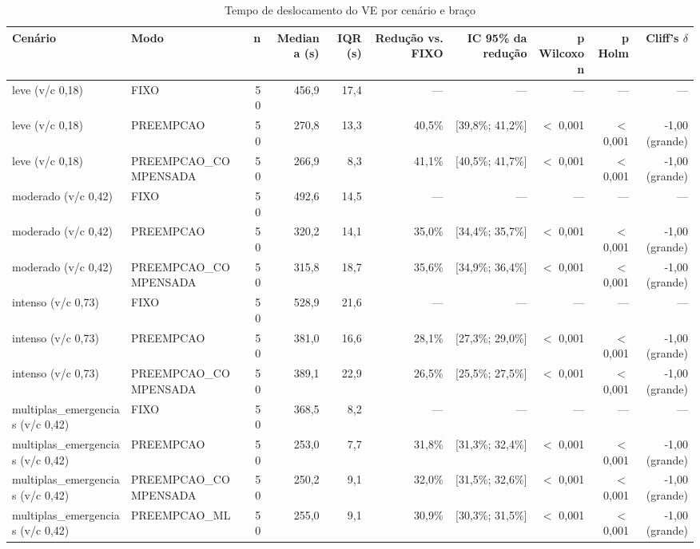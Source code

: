 \begin{table}[htbp]
\centering
\caption{Tempo de deslocamento do VE por cenário e braço}
\label{tab:t1}
\small
\begin{tabular}{llrrrrrrrr}
\toprule
Cenário & Modo & n & Mediana (s) & IQR (s) & Redução vs. FIXO & IC 95\% da redução & p Wilcoxon & p Holm & Cliff's $\delta$ \\
\midrule
leve (v/c 0,18) & FIXO & 50 & 456,9 & 17,4 & — & — & — & — & — \\
leve (v/c 0,18) & PREEMPCAO & 50 & 270,8 & 13,3 & 40,5\% & [39,8\%; 41,2\%] & $<$ 0,001 & $<$ 0,001 & -1,00 (grande) \\
leve (v/c 0,18) & PREEMPCAO\_COMPENSADA & 50 & 266,9 & 8,3 & 41,1\% & [40,5\%; 41,7\%] & $<$ 0,001 & $<$ 0,001 & -1,00 (grande) \\
moderado (v/c 0,42) & FIXO & 50 & 492,6 & 14,5 & — & — & — & — & — \\
moderado (v/c 0,42) & PREEMPCAO & 50 & 320,2 & 14,1 & 35,0\% & [34,4\%; 35,7\%] & $<$ 0,001 & $<$ 0,001 & -1,00 (grande) \\
moderado (v/c 0,42) & PREEMPCAO\_COMPENSADA & 50 & 315,8 & 18,7 & 35,6\% & [34,9\%; 36,4\%] & $<$ 0,001 & $<$ 0,001 & -1,00 (grande) \\
intenso (v/c 0,73) & FIXO & 50 & 528,9 & 21,6 & — & — & — & — & — \\
intenso (v/c 0,73) & PREEMPCAO & 50 & 381,0 & 16,6 & 28,1\% & [27,3\%; 29,0\%] & $<$ 0,001 & $<$ 0,001 & -1,00 (grande) \\
intenso (v/c 0,73) & PREEMPCAO\_COMPENSADA & 50 & 389,1 & 22,9 & 26,5\% & [25,5\%; 27,5\%] & $<$ 0,001 & $<$ 0,001 & -1,00 (grande) \\
multiplas\_emergencias (v/c 0,42) & FIXO & 50 & 368,5 & 8,2 & — & — & — & — & — \\
multiplas\_emergencias (v/c 0,42) & PREEMPCAO & 50 & 253,0 & 7,7 & 31,8\% & [31,3\%; 32,4\%] & $<$ 0,001 & $<$ 0,001 & -1,00 (grande) \\
multiplas\_emergencias (v/c 0,42) & PREEMPCAO\_COMPENSADA & 50 & 250,2 & 9,1 & 32,0\% & [31,5\%; 32,6\%] & $<$ 0,001 & $<$ 0,001 & -1,00 (grande) \\
multiplas\_emergencias (v/c 0,42) & PREEMPCAO\_ML & 50 & 255,0 & 9,1 & 30,9\% & [30,3\%; 31,5\%] & $<$ 0,001 & $<$ 0,001 & -1,00 (grande) \\
\bottomrule
\end{tabular}
\end{table}
